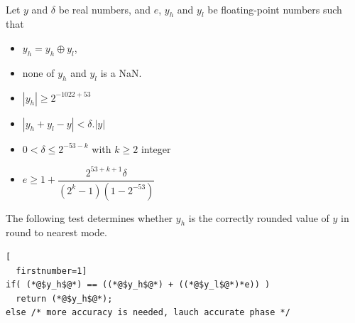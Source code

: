 \begin{theorem}
\label{th:roundingRN1}
~\\
      Let $y$ and $\delta$ be real numbers, and $e$, $y_h$ and $y_l$ be
  floating-point numbers such that 
  \begin{itemize}
  \item $y_h=y_h\oplus y_l$,
  \item none of $y_h$ and $y_l$ is a  NaN.
  \item $|y_h|\ge 2^{-1022+53}$ 
  \item $|y_h+y_l - y| < \delta.|y|$
  \item $0< \delta \le 2^{-53-k}$ with $k\ge 2$ integer
  \item $e\ge 1+  \dfrac{2^{53+k+1}\delta}{(2^{k}-1)(1-2^{-53})}$
\end{itemize}

The following test determines whether $y_h$ is the
  correctly rounded value of $y$ in  round to nearest mode.

\begin{lstlisting}[
  firstnumber=1]
if( (*@$y_h$@*) == ((*@$y_h$@*) + ((*@$y_l$@*)*e)) )
  return (*@$y_h$@*);
else /* more accuracy is needed, lauch accurate phase */
\end{lstlisting}
\end{theorem}

